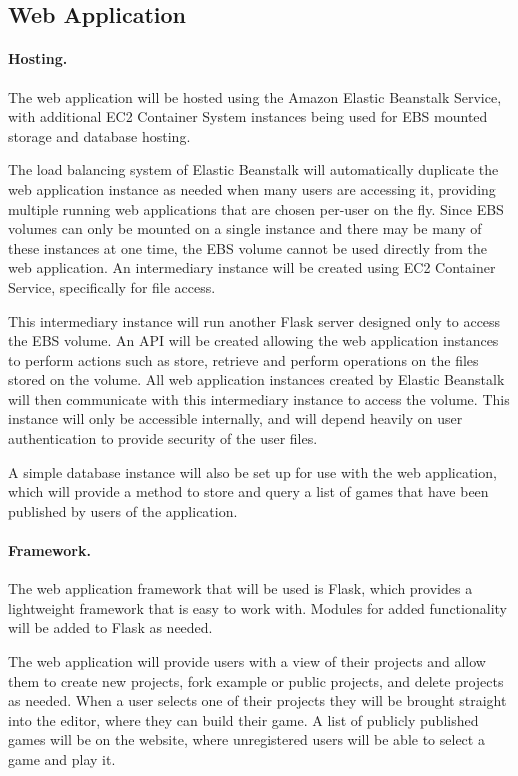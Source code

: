 \documentclass[a4paper, 12pt]{article}
\begin{document}
\subsection{Web Application}
\paragraph{Hosting.}
The web application will be hosted using the Amazon Elastic Beanstalk Service, with additional EC2 Container System instances being used for EBS mounted storage and database hosting.

The load balancing system of Elastic Beanstalk will automatically duplicate the web application instance as needed when many users are accessing it, providing multiple running web applications that are chosen per-user on the fly. Since EBS volumes can only be mounted on a single instance and there may be many of these instances at one time, the EBS volume cannot be used directly from the web application. An intermediary instance will be created using EC2 Container Service, specifically for file access. 

This intermediary instance will run another Flask server designed only to access the EBS volume. An API will be created allowing the web application instances to perform actions such as store, retrieve and perform operations on the files stored on the volume. All web application instances created by Elastic Beanstalk will then communicate with this intermediary instance to access the volume. This instance will only be accessible internally, and will depend heavily on user authentication to provide security of the user files.

A simple database instance will also be set up for use with the web application, which will provide a method to store and query a list of games that have been published by users of the application.

\paragraph{Framework.}
The web application framework that will be used is Flask, which provides a lightweight framework that is easy to work with. Modules for added functionality will be added to Flask as needed.

The web application will provide users with a view of their projects and allow them to create new projects, fork example or public projects, and delete projects as needed. When a user selects one of their projects they will be brought straight into the editor, where they can build their game. A list of publicly published games will be on the website, where unregistered users will be able to select a game and play it.
\end{document}
